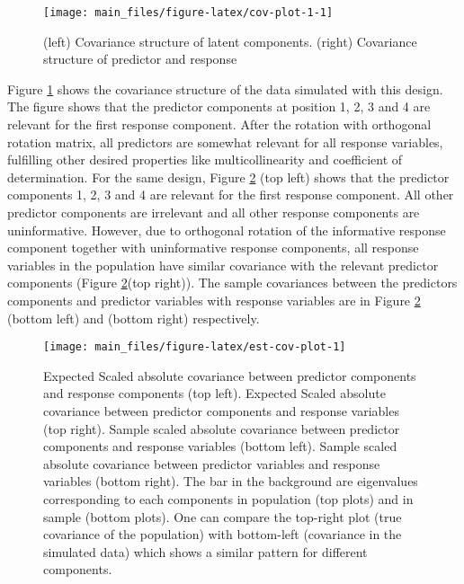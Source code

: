 \documentclass[12pt,3p,authoryear]{elsarticle}
\begin{document}
\begin{figure}
\texttt{[image: main\_files/figure-latex/cov-plot-1-1]} \caption{(left) Covariance structure of latent components. (right) Covariance structure of predictor and response}\label{fig:cov-plot-1}
\end{figure}

Figure \ref{fig:cov-plot-1} shows the covariance structure of the data
simulated with this design. The figure shows that the predictor
components at position 1, 2, 3 and 4 are relevant for the first response
component. After the rotation with orthogonal rotation matrix, all
predictors are somewhat relevant for all response variables, fulfilling
other desired properties like multicollinearity and coefficient of
determination. For the same design, Figure \ref{fig:est-cov-plot} (top
left) shows that the predictor components 1, 2, 3 and 4 are relevant for
the first response component. All other predictor components are
irrelevant and all other response components are uninformative. However,
due to orthogonal rotation of the informative response component
together with uninformative response components, all response variables
in the population have similar covariance with the relevant predictor
components (Figure \ref{fig:est-cov-plot}(top right)). The sample
covariances between the predictors components and predictor variables
with response variables are in Figure \ref{fig:est-cov-plot} (bottom
left) and (bottom right) respectively.













\begin{figure}
\texttt{[image: main\_files/figure-latex/est-cov-plot-1]} \caption{Expected Scaled absolute covariance between predictor
components and response components (top left). Expected Scaled absolute
covariance between predictor components and response variables (top
right). Sample scaled absolute covariance between predictor components
and response variables (bottom left). Sample scaled absolute covariance
between predictor variables and response variables (bottom right). The
bar in the background are eigenvalues corresponding to each components
in population (top plots) and in sample (bottom plots). One can compare
the top-right plot (true covariance of the population) with bottom-left
(covariance in the simulated data) which shows a similar pattern for
different components.}\label{fig:est-cov-plot}
\end{figure}
\end{document}

